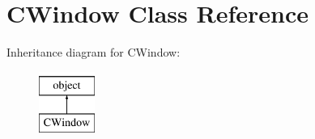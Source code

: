 \hypertarget{class_c_window_1_1_c_window}{}\section{C\+Window Class Reference}
\label{class_c_window_1_1_c_window}
Inheritance diagram for C\+Window\+:\begin{figure}[H]
\begin{center}
\leavevmode
\includegraphics[height=2.000000cm]{class_c_window_1_1_c_window}
\end{center}
\end{figure}
